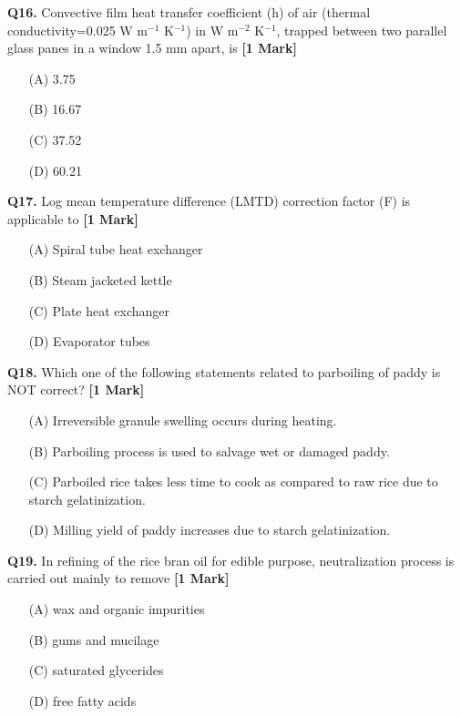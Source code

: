 \documentclass[11pt]{article}
\newcommand{\questiona}[2]{
    \noindent\textbf{Q#2.} #1 \hfill \textbf{[1 Mark]}
}
\begin{document}
\questiona{Convective film heat transfer coefficient (h) of air (thermal conductivity=0.025 W m\(^{-1}\) K\(^{-1}\)) in W m\(^{-2}\) K\(^{-1}\), trapped between two parallel glass panes in a window 1.5 mm apart, is}{16}
\begin{enumerate}
    \item[(A)] 3.75  
    \item[(B)] 16.67  
    \item[(C)] 37.52  
    \item[(D)] 60.21  
\end{enumerate}
\vspace{0.5cm}

\questiona{Log mean temperature difference (LMTD) correction factor (F) is applicable to}{17}
\begin{enumerate}
    \item[(A)] Spiral tube heat exchanger  
    \item[(B)] Steam jacketed kettle  
    \item[(C)] Plate heat exchanger  
    \item[(D)] Evaporator tubes  
\end{enumerate}
\vspace{0.5cm}

\questiona{Which one of the following statements related to parboiling of paddy is NOT correct?}{18}
\begin{enumerate}
    \item[(A)] Irreversible granule swelling occurs during heating.  
    \item[(B)] Parboiling process is used to salvage wet or damaged paddy.  
    \item[(C)] Parboiled rice takes less time to cook as compared to raw rice due to starch gelatinization.  
    \item[(D)] Milling yield of paddy increases due to starch gelatinization.  
\end{enumerate}
\vspace{0.5cm}

\questiona{In refining of the rice bran oil for edible purpose, neutralization process is carried out mainly to remove}{19}
\begin{enumerate}
    \item[(A)] wax and organic impurities  
    \item[(B)] gums and mucilage  
    \item[(C)] saturated glycerides  
    \item[(D)] free fatty acids  
\end{enumerate}
\vspace{0.5cm}
\end{document}
